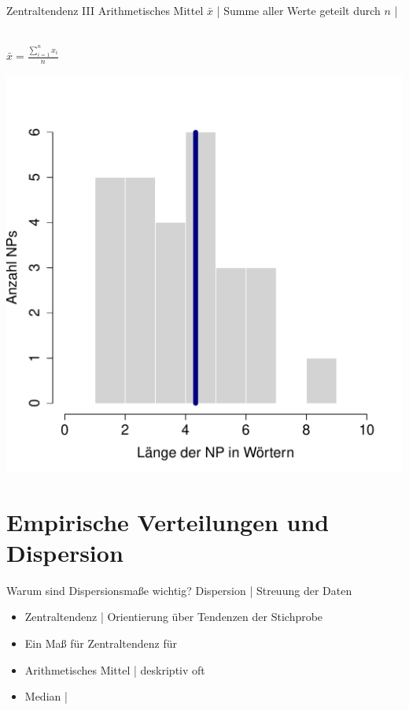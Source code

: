 \begin{frame}
  {Zentraltendenz III}
  \alert{Arithmetisches Mittel} $\bar{x}$ | Summe aller Werte geteilt durch $n$ | \\
  \Zeile
  \begin{multicols}{2}
    \centering 
    \hspace{0em}\\
    \vspace{0.1\textheight}
    $\bar{x}=\frac{\sum\limits_{i=1}^{n}x_i}{n}$
    \newpage
    \raggedright
    \includegraphics[height=0.6\textheight]{RVorlesung/mean}
  \end{multicols}
\end{frame}



\section{Empirische Verteilungen und Dispersion}

\begin{frame}
  {Warum sind Dispersionsmaße wichtig?}
  \alert{Dispersion} | Streuung der Daten\\
  \Zeile
  \begin{itemize}[<+->]
    \item \alert{Zentraltendenz} | Orientierung über Tendenzen der Stichprobe
     \Zeile 
    \item \alert{Ein Maß für Zentraltendenz} für 
      \Halbzeile
    \item Arithmetisches Mittel | deskriptiv oft 
    \item Median | 
  \end{itemize}
\end{frame}

